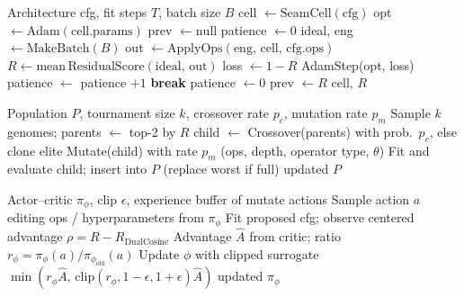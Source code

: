 \begin{algorithm}[t]
\caption{FitCell (inner loop)}
\label{alg:fit}
\begin{algorithmic}[1]
\Require Architecture cfg, fit steps $T$, batch size $B$
\State cell $\gets \mathrm{SeamCell}(\mathrm{cfg})$
\State opt $\gets \mathrm{Adam}(\mathrm{cell.params})$
\State prev $\gets \mathrm{null}$
\State patience $\gets 0$
  \State ideal, eng $\gets \mathrm{MakeBatch}(B)$
  \State out $\gets \mathrm{ApplyOps}(\mathrm{eng},\,\mathrm{cell},\,\mathrm{cfg.ops})$
  \State $R \gets \mathrm{mean}\,\mathrm{ResidualScore}(\mathrm{ideal},\,\mathrm{out})$
  \State loss $\gets 1-R$
    \State AdamStep(opt, loss)
  \EndIf
    \State patience $\gets$ patience $+1$
      \State \textbf{break}
    \EndIf
  \Else
    \State patience $\gets 0$
  \EndIf
  \State prev $\gets R$
\EndFor
\State \Return cell, $R$
\end{algorithmic}
\end{algorithm}

\begin{algorithm}[t]
\caption{GA tournament step}
\label{alg:ga}
\begin{algorithmic}[1]
\Require Population $P$, tournament size $k$, crossover rate $p_c$, mutation rate $p_m$
\State Sample $k$ genomes; parents $\gets$ top-2 by $R$
\State child $\gets$ Crossover(parents) with prob.\ $p_c$, else clone elite
\State Mutate(child) with rate $p_m$ (ops, depth, operator type, $\theta$)
\State Fit and evaluate child; insert into $P$ (replace worst if full)
\State \Return updated $P$
\end{algorithmic}
\end{algorithm}

\begin{algorithm}[t]
\caption{PPO architecture update}
\label{alg:ppo}
\begin{algorithmic}[1]
\Require Actor--critic $\pi_\phi$, clip $\epsilon$, experience buffer of mutate actions
\State Sample action $a$ editing ops / hyperparameters from $\pi_\phi$
\State Fit proposed cfg; observe centered advantage $\rho = R - R_{\mathrm{DualCosine}}$ 
\State Advantage $\hat{A}$ from critic; ratio $r_\phi = \pi_\phi(a)/\pi_{\phi_{\mathrm{old}}}(a)$
\State Update $\phi$ with clipped surrogate $\min(r_\phi\hat{A},\,\mathrm{clip}(r_\phi,1-\epsilon,1+\epsilon)\hat{A})$
\State \Return updated $\pi_\phi$
\end{algorithmic}
\end{algorithm}

